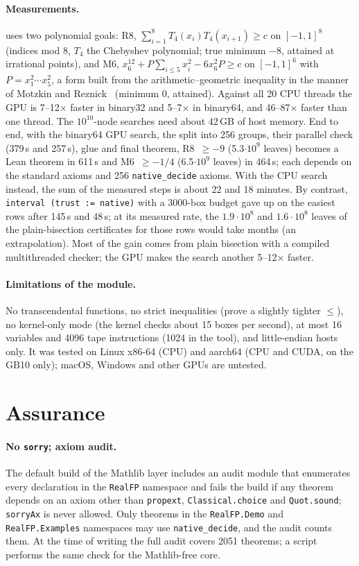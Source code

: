 \documentclass[11pt]{article}
\theoremstyle{definition}
\theoremstyle{remark}
\newcommand{\lean}[1]{\texttt{#1}}
\begin{document}
\paragraph{Measurements.}  uses two polynomial goals:
R8, $\sum_{i=1}^8 T_4(x_i)T_4(x_{i+1})\ge c$ on $[-1,1]^8$ (indices mod 8,
$T_4$ the Chebyshev polynomial; true minimum $-8$, attained at irrational
points), and M6, $x_6^{12}+P\sum_{i\le5}x_i^2-6x_6^2P\ge c$ on $[-1,1]^6$
with $P=x_1^2\cdots x_5^2$, a form built from the arithmetic--geometric
inequality in the manner of Motzkin and Reznick~\cite{motzkin1967,reznick1989}
(minimum $0$, attained). Against all 20 CPU threads the GPU is 7--12$\times$
faster in binary32 and 5--7$\times$ in binary64, and 46--87$\times$ faster
than one thread. The $10^{10}$-node searches need about 42\,GB of host memory.
End to end, with the binary64 GPU search, the split into 256 groups, their
parallel check (379\,s and 257\,s), glue and final theorem, R8~$\ge-9$
(5.3$\cdot10^9$ leaves) becomes a Lean theorem in 611\,s and M6~$\ge-1/4$
(6.5$\cdot10^9$ leaves) in 464\,s; each depends on the standard axioms and
256 \lean{native\_decide} axioms. With the CPU search instead, the sum of the
measured steps is about 22 and 18 minutes. By contrast,
\lean{interval (trust := native)} with a 3000-box budget gave up on the
easiest rows after 145\,s and 48\,s; at its measured rate, the
$1.9\cdot10^8$ and $1.6\cdot10^8$ leaves of the plain-bisection
certificates for those rows would take months (an extrapolation). Most of
the gain comes from plain bisection with a compiled multithreaded checker;
the GPU makes the search another 5--12$\times$ faster.

\paragraph{Limitations of the module.} No transcendental functions, no strict
inequalities (prove a slightly tighter $\le$), no kernel-only mode (the
kernel checks about 15 boxes per second), at most 16 variables and 4096 tape
instructions (1024 in the tool), and little-endian hosts only. It was tested
on Linux x86-64 (CPU) and aarch64 (CPU and CUDA, on the GB10 only); macOS,
Windows and other GPUs are untested.

\section{Assurance}\label{sec:assurance}

\paragraph{No \lean{sorry}; axiom audit.} The default build of the Mathlib
layer includes an audit module that enumerates every declaration in the
\lean{RealFP} namespace and fails the build if any theorem depends on an
axiom other than \lean{propext}, \lean{Classical.choice} and
\lean{Quot.sound}; \lean{sorryAx} is never allowed. Only theorems in the
\lean{RealFP.Demo} and \lean{RealFP.Examples} namespaces may use
\lean{native\_decide}, and the audit counts them. At the time of writing the
full audit covers 2051 theorems; a script performs the same check for the
Mathlib-free core.
\end{document}
